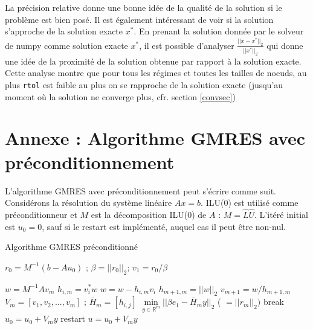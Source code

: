 \documentclass[11pt]{article}
\begin{document}
La précision relative donne une bonne idée de la qualité de la solution si le problème est bien posé. Il est également intéressant de voir si la solution s'approche de la solution exacte $x^*$. En prenant la solution donnée par le solveur de numpy comme solution exacte $x^*$, il est possible d'analyser $\frac{||x-x^*||_2}{||x^*||_2}$ qui donne une idée de la proximité de la solution obtenue par rapport à la solution exacte. Cette analyse montre que pour tous les régimes et toutes les tailles de noeuds, au plus \texttt{rtol} est faible au plus on se rapproche de la solution exacte (jusqu'au moment où la solution ne converge plus, cfr. section \ref{convsec})

\newpage
\appendices
\section{Annexe : Algorithme GMRES avec préconditionnement}\label{GMRESannex}
L'algorithme GMRES avec préconditionnement peut s'écrire comme suit. Considérons la résolution du système linéaire $Ax = b$. ILU(0) est utilisé comme préconditionneur et $M$ est la décomposition ILU(0) de $A$ : $M = \hat{L}\hat{U}$. L'itéré initial est $u_0 = 0$, sauf si le restart est implémenté, auquel cas il peut être non-nul.

\begin{algorithm}
\caption{Algorithme GMRES préconditionné}\label{GMRESalgo}
\begin{algorithmic}
\State $r_0 = M^{-1}(b - A u_0)$ ;  $\beta = ||r_0||_2$; $v_1 = r_0/\beta$ 

    \State $w = M^{-1} A v_m$ 
        \State $h_{i, m} = v_i^* w$
        \State $w = w - h_{i, m}v_i$
    \EndFor
    \State $h_{m+1, m} = ||w||_2$
    \State $v_{m+1} = w / h_{m+1, m}$
    \State
    \State $V_m = [v_1, v_2, ..., v_m]$ ; $\bar{H}_m = [h_{i, j}]$
    \State $\min\limits_{y \in \mathbb{R}^m} ||\beta e_1 - \bar{H}_my||_2$ ( $ = || r_m||_2)$ 
    \State
        \State break
    \EndIf
\EndFor
{}
    \State $u_0 = u_0 + V_m y$
    \State restart
\EndIf
\State $u = u_0 + V_m y$
\end{algorithmic}
\end{algorithm}
\end{document}
